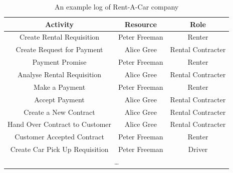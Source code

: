 \begin{table}[ht!]
\centering
\begin{tabular}{ | c | c | c | }
\hline
	\textbf{Activity} & \textbf{Resource} & \textbf{Role} \\ \hline
	Create Rental  Requisition & Peter Freeman & Renter \\ \hline
	Create Request for Payment & Alice Gree & Rental Contracter \\ \hline
	Payment Promise & Peter Freeman & Renter \\ \hline
	Analyse Rental Requisition & Alice Gree & Rental Contracter \\ \hline
	Make a Payment & Peter Freeman & Renter \\ \hline
	Accept Payment & Alice Gree & Rental Contracter \\ \hline
	Create a New Contract & Alice Gree & Rental Contracter \\ \hline
	Hand Over Contract to Customer & Alice Gree & Rental Contracter \\ \hline
	Customer Accepted Contract & Peter Freeman & Renter \\ \hline
	Create Car Pick Up  Requisition & Peter Freeman & Driver \\ \hline
    \multicolumn{3}{|c|}{\dots} \\ \hline
    
\end{tabular}
\caption{An example log of Rent-A-Car company}
\label{tab:rac-log}
  

\end{table}
